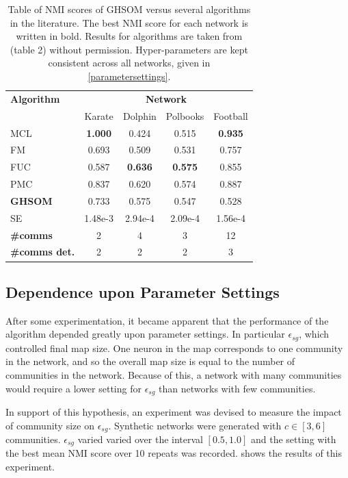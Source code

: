 \documentclass{article}
\begin{document}
\begin{table}
\centering
\begin{tabular}{ p{1.95cm} c c c c }
\toprule
\textbf{Algorithm} & \multicolumn{4}{c}{\textbf{Network}}\\
{} & Karate & Dolphin & Polbooks & Football \\ 
\bottomrule
MCL & \textbf{1.000} & 0.424 & 0.515 & \textbf{0.935} \\ 
FM & 0.693 & 0.509 & 0.531 & 0.757 \\ 
FUC & 0.587 & \textbf{0.636} & \textbf{0.575} & 0.855 \\ 
PMC & 0.837 & 0.620 & 0.574 & 0.887 \\ 
\toprule
\textbf{GHSOM} & 0.733 & 0.575 & 0.547 & 0.528 \\
SE & 1.48e-3 & 2.94e-4 & 2.09e-4 & 1.56e-4 \\
\bottomrule
\textbf{\#comms} & 2 & 4 & 3 & 12 \\
\textbf{\#comms det.} & 2 & 2 & 2 & 3 \\
\bottomrule 
\end{tabular}
\caption{Table of NMI scores of GHSOM versus several algorithms in the literature. The best NMI score for each network is written in bold. Results for algorithms are taken from \protect\cite{yang2013hierarchical} (table 2) without permission. Hyper-parameters are kept consistent across all networks, given in \cref{parametersettings}.}
\label{real_world_experiment}
\end{table}

\subsection{Dependence upon Parameter Settings}
After some experimentation, it became apparent that the performance of the algorithm depended greatly upon parameter settings. 
In particular $\epsilon_{sg}$, which controlled final map size. 
One neuron in the map corresponds to one community in the network, and so the overall map size is equal to the number of communities in the network. 
Because of this, a network with many communities would require a lower setting for $\epsilon_{sg}$ than networks with few communities. 

In support of this hypothesis, an experiment was devised to measure the impact of community size on $\epsilon_{sg}$. Synthetic networks were generated with $c\in[3,6]$ communities. $\epsilon_{sg}$ varied varied over the interval $[0.5, 1.0]$ and the setting with the best mean NMI score over 10 repeats was recorded.  shows the results of this experiment.
\end{document}

